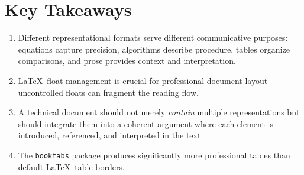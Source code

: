 \documentclass[11pt, a4paper]{article}
\begin{document}
\section{Key Takeaways}

\begin{enumerate}[nosep]
    \item Different representational formats serve different communicative purposes: equations capture precision, algorithms describe procedure, tables organize comparisons, and prose provides context and interpretation.
    \item \LaTeX\ float management is crucial for professional document layout --- uncontrolled floats can fragment the reading flow.
    \item A technical document should not merely \emph{contain} multiple representations but should integrate them into a coherent argument where each element is introduced, referenced, and interpreted in the text.
    \item The \texttt{booktabs} package produces significantly more professional tables than default \LaTeX\ table borders.
\end{enumerate}
\end{document}
